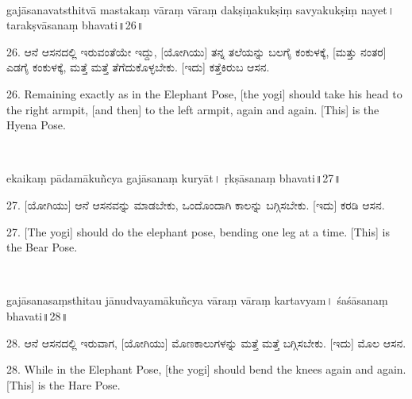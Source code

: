 ~\vskip 1cm

\dummyimage
\begin{sans}
gajāsanavatsthitvā mastakaṃ vāraṃ vāraṃ dakṣiṇakukṣiṃ savyakukṣiṃ nayet। tarakṣvāsanaṃ bhavati॥26॥
\end{sans}
\bigskip

\begin{kan}
26.	ಆನೆ ಆಸನದಲ್ಲಿ ಇರುವಂತೆಯೇ ಇದ್ದು, [ಯೋಗಿಯು] ತನ್ನ ತಲೆಯನ್ನು ಬಲಗೈ ಕಂಕುಳಕ್ಕೆ, [ಮತ್ತು ನಂತರ] ಎಡಗೈ ಕಂಕುಳಕ್ಕೆ, ಮತ್ತೆ ಮತ್ತೆ ತೆಗೆದುಕೊಳ್ಳಬೇಕು. [ಇದು] ಕತ್ತೆಕಿರುಬ ಆಸನ.
\end{kan}
\bigskip

\begin{eng}
26. Remaining exactly as in the Elephant Pose, [the yogi] should take his head to the right armpit, [and then] to the left armpit, again and again. [This] is the Hyena Pose.
\end{eng}
\newpage

~\vskip 1cm

\dummyimage
\begin{sans}
ekaikaṃ pādamākuñcya gajāsanaṃ kuryāt। ṛkṣāsanaṃ bhavati॥27॥
\end{sans}
\bigskip

\begin{kan}
27.	[ಯೋಗಿಯು] ಆನೆ ಆಸನವನ್ನು ಮಾಡಬೇಕು, ಒಂದೊಂದಾಗಿ ಕಾಲನ್ನು ಬಗ್ಗಿಸಬೇಕು. [ಇದು] ಕರಡಿ ಆಸನ.
\end{kan}
\bigskip

\begin{eng}
27. [The yogi] should do the elephant pose, bending one leg at a time. [This] is the Bear Pose.
\end{eng}
\newpage

~\vskip 1cm

\dummyimage
\begin{sans}
gajāsanasaṃsthitau\endnote{°saṃsthitau~] P, °sthitau M.} jānudvayamākuñcya vāraṃ vāraṃ kartavyam। śaśāsanaṃ bhavati॥28॥
\end{sans}
\bigskip

\begin{kan}
28.	ಆನೆ ಆಸನದಲ್ಲಿ ಇರುವಾಗ, [ಯೋಗಿಯು] ಮೊಣಕಾಲುಗಳನ್ನು ಮತ್ತೆ ಮತ್ತೆ ಬಗ್ಗಿಸಬೇಕು. [ಇದು] ಮೊಲ ಆಸನ.
\end{kan}
\bigskip

\begin{eng}
28. While in the Elephant Pose, [the yogi] should bend the knees again and again. [This] is the Hare Pose.
\end{eng}

\newpage

~\vskip 1cm

